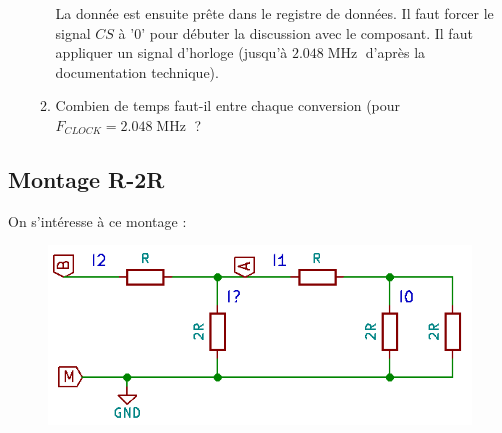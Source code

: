 \begin{enumerate}
\begin{enumerate}
{	La donnée est ensuite prête dans le registre de données. Il faut forcer le signal $CS$ à '0' pour débuter la discussion avec le composant.
	Il faut appliquer un signal d'horloge (jusqu'à $2.048\operatorname{MHz}$ d'après la documentation technique).
}
		\item Combien de temps faut-il entre chaque conversion (pour $F_{CLOCK} = 2.048\operatorname{MHz}$ ?
	
	\end{enumerate}
	
\end{enumerate}



\subsection*{Montage R-2R}

On s'intéresse à ce montage :

\begin{figure}[!h]
	\centering
	\includegraphics{images/TD/convAN_R2R_a.png}
\end{figure}


